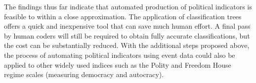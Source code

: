 \documentclass[12pt,letterpaper]{article}
\begin{document}
The findings thus far indicate that automated production of political indicators is feasible to within a close approximation. The application of classification trees offers a quick and inexpensive tool that can save much human effort. A final pass by human coders will still be required to obtain fully accurate classifications, but the cost can be substantially reduced. With the additional steps proposed above, the process of automating political indicators using event data could also be applied to other widely used indices such as the Polity and Freedom House regime scales (measuring democracy and autocracy).



\pagebreak
\singlespacing
\setlength{\bibsep}{0.0pt}


\end{document}
